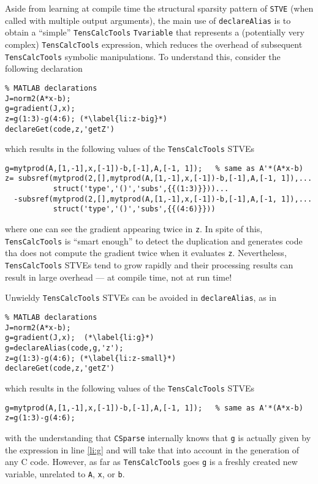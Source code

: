 \documentclass[11pt]{article}
\newcommand{\TC}{\texttt{TensCalcTools}}
\newcommand{\CS}{\texttt{CSparse}}
\begin{document}
Aside from learning at compile time the structural sparsity pattern of
\lstinline{STVE} (when called with multiple output arguments), the
main use of \lstinline{declareAlias} is to obtain a ``simple''
\TC{} \lstinline{Tvariable} that represents a (potentially very
complex) \TC{} expression, which reduces the overhead of subsequent
\TC{} symbolic manipulations. To understand this, consider the
following declaration
\begin{lstlisting}
% MATLAB declarations
J=norm2(A*x-b);
g=gradient(J,x);
z=g(1:3)-g(4:6); (*\label{li:z-big}*)
declareGet(code,z,'getZ')
\end{lstlisting}
which results in the following values of the \TC{} STVEs
\begin{lstlisting}
g=mytprod(A,[1,-1],x,[-1])-b,[-1],A,[-1, 1]);   % same as A'*(A*x-b)
z= subsref(mytprod(2,[],mytprod(A,[1,-1],x,[-1])-b,[-1],A,[-1, 1]),...
           struct('type','()','subs',{{(1:3)}}))...
  -subsref(mytprod(2,[],mytprod(A,[1,-1],x,[-1])-b,[-1],A,[-1, 1]),...
           struct('type','()','subs',{{(4:6)}}))
\end{lstlisting}
where one can see the gradient appearing twice in \lstinline{z}. In
spite of this, \TC{} is ``smart enough'' to detect the duplication and
generates code tha does not compute the gradient twice when it
evaluates \lstinline{z}. Nevertheless, \TC{} STVEs tend to grow
rapidly and their processing results can result in large overhead ---
at compile time, not at run time!

\medskip

Unwieldy \TC{} STVEs can be avoided in \lstinline{declareAlias},
as in
\begin{lstlisting}
% MATLAB declarations
J=norm2(A*x-b);
g=gradient(J,x);  (*\label{li:g}*)
g=declareAlias(code,g,'z');
z=g(1:3)-g(4:6); (*\label{li:z-small}*)
declareGet(code,z,'getZ')
\end{lstlisting}
which results in the following values of the \TC{} STVEs
\begin{lstlisting}
g=mytprod(A,[1,-1],x,[-1])-b,[-1],A,[-1, 1]);   % same as A'*(A*x-b)
z=g(1:3)-g(4:6); 
\end{lstlisting}
with the understanding that \CS{} internally knows that \lstinline{g}
is actually given by the expression in line \ref{li:g} and will take
that into account in the generation of any C code. However, as far as
\TC{} goes \lstinline{g} is a freshly created new variable, unrelated
to \lstinline{A}, \lstinline{x}, or \lstinline{b}.

\medskip
\end{document}
